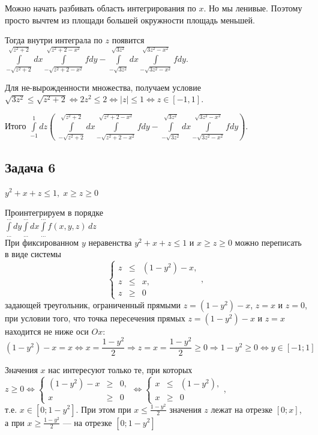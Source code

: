 \documentclass[a4paper, fleqn]{article}
\begin{document}
    Можно начать разбивать область интегрирования по $x$. Но мы ленивые. Поэтому просто вычтем из площади большей окружности площадь меньшей.
    
    Тогда внутри интеграла по $z$ появится $\displaystyle \int \limits_{-\sqrt{z^2 + 2}}^{\sqrt{z^2 + 2}} dx \int \limits_{-\sqrt{z^2 + 2 - x^2}}^{\sqrt{z^2 + 2 - x^2}} f dy - \int \limits_{-\sqrt{3z^2}}^{\sqrt{3z^2}} dx \int \limits_{-\sqrt{3z^2- x^2}}^{\sqrt{3z^2 - x^2}} f dy  .$
    
    
    Для не-вырожденности множества, получаем условие $\sqrt{3z^2} \leq \sqrt{z^2 + 2} \iff 2z^2 \leq 2 \iff |z| \leq 1 \iff z \in [-1, 1].$
    
    
    Итого $\displaystyle \int \limits_{-1}^{1} dz \left( \; \int \limits_{-\sqrt{z^2 + 2}}^{\sqrt{z^2 + 2}} dx \int \limits_{-\sqrt{z^2 + 2 - x^2}}^{\sqrt{z^2 + 2 - x^2}} f dy - \int \limits_{-\sqrt{3z^2}}^{\sqrt{3z^2}} dx \int \limits_{-\sqrt{3z^2- x^2}}^{\sqrt{3z^2 - x^2}} f dy  \right).$
    
    \subsection*{Задача 6}
    
    $y^2 + x + z \le 1, \; x \ge z \ge 0$
    
    Проинтегрируем в порядке \\[3 pt]
    $\int\limits_{\dots}^{\dots} dy \int\limits_{\dots}^{\dots} dx \int\limits_{\dots}^{\dots} f(x, y, z)\, dz$ \\
    
    При фиксированном $y$ неравенства $y^2 + x + z \le 1$ и $x \ge z \ge 0$ можно переписать в виде системы
    \[ \left\{\begin{array}{rcl} z &\le& (1-y^2) - x, \\ z &\le& x, \\ z &\ge& 0 \end{array}\right., \]
    задающей треугольник, ограниченный прямыми $z = (1-y^2)-x$, $z = x$ и $z = 0$, при условии того, что точка пересечения прямых $z = (1-y^2)-x$ и $z = x$ находится не ниже оси $Ox$:
    \[ (1-y^2)-x = x \Leftrightarrow x = \frac{1-y^2}2 \Rightarrow z = x = \frac{1-y^2}2 \ge 0 \Rightarrow 1-y^2 \ge 0 \Leftrightarrow y \in [-1; 1] \]
    
    Значения $x$ нас интересуют только те, при которых $z \ge 0 \Leftrightarrow \left\{\begin{array}{rcl} (1-y^2)-x &\ge& 0, \\ x &\ge& 0 \end{array}\right. \Leftrightarrow \left\{\begin{array}{rcl} x &\le& (1-y^2), \\ x &\ge& 0 \end{array}\right.$, \\[3 pt]
    т.е. $x \in [0; 1-y^2]$. При этом при $x \le \frac{1-y^2}2$ значения $z$ лежат на отрезке $[0; x]$, а при $x \ge \frac{1-y^2}2$ --- на отрезке $[0; 1-y^2]$ \\
    
\end{document}
